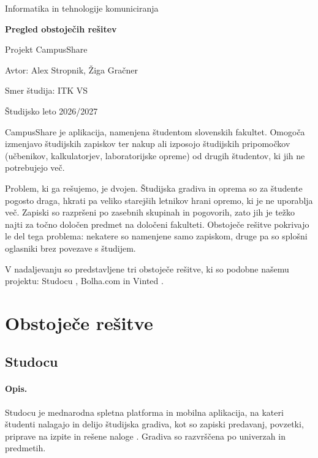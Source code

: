 \documentclass[12pt,a4paper]{article}
\begin{document}
\begin{titlepage}
    \centering
    \vspace*{3cm}
    {\Large Informatika in tehnologije komuniciranja\par}
    \vspace{1.5cm}
    {\Huge\bfseries Pregled obstoječih rešitev\par}
    \vspace{0.5cm}
    {\Large Projekt CampusShare\par}
    \vfill
    {\large Avtor: Alex Stropnik, Žiga Gračner\par}
    \vspace{0.3cm}
    {\large Smer študija: ITK VS\par}
    \vspace{0.3cm}
    {\large Študijsko leto 2026/2027\par}
    \vspace{2cm}
\end{titlepage}

\tableofcontents
\newpage




CampusShare je aplikacija, namenjena študentom slovenskih fakultet. Omogoča
izmenjavo študijskih zapiskov ter nakup ali izposojo študijskih pripomočkov
(učbenikov, kalkulatorjev, laboratorijske opreme) od drugih študentov, ki jih
ne potrebujejo več.

Problem, ki ga rešujemo, je dvojen. Študijska gradiva in oprema so za
študente pogosto draga, hkrati pa veliko starejših letnikov hrani opremo, ki
je ne uporablja več. Zapiski so razpršeni po zasebnih skupinah in pogovorih,
zato jih je težko najti za točno določen predmet na določeni fakulteti.
Obstoječe rešitve pokrivajo le del tega problema: nekatere so namenjene samo
zapiskom, druge pa so splošni oglasniki brez povezave s študijem.

V nadaljevanju so predstavljene tri obstoječe rešitve, ki so podobne našemu
projektu: Studocu \cite{studocu}, Bolha.com \cite{bolha} in Vinted
\cite{vinted}.


\section{Obstoječe rešitve}


\subsection{Studocu}

\paragraph{Opis.}
Studocu je mednarodna spletna platforma in mobilna aplikacija, na kateri
študenti nalagajo in delijo študijska gradiva, kot so zapiski predavanj,
povzetki, priprave na izpite in rešene naloge \cite{studocu, sme_studocu}.
Gradiva so razvrščena po univerzah in predmetih.
\end{document}
